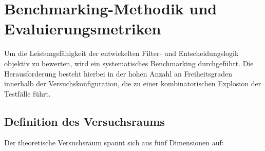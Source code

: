\chapter{Benchmarking-Methodik und Evaluierungsmetriken}
\label{sec:benchmarking_methodik}

Um die Leistungsfähigkeit der entwickelten Filter- und Entscheidungslogik objektiv zu bewerten, wird ein systematisches Benchmarking durchgeführt. Die Herausforderung besteht hierbei in der hohen Anzahl an Freiheitsgraden innerhalb der Versuchskonfiguration, die zu einer kombinatorischen Explosion der Testfälle führt.

\section{Definition des Versuchsraums}
\label{subsec:versuchsraum}
Der theoretische Versuchsraum spannt sich aus fünf Dimensionen auf:

